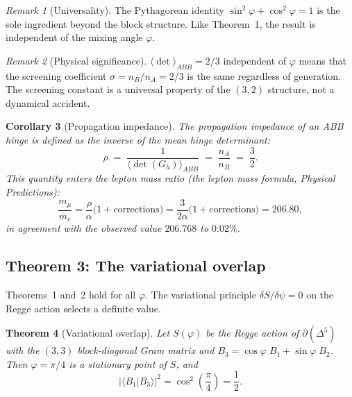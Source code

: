 \documentclass[12pt]{article}
\newtheorem{theorem}{Theorem}[section]
\newtheorem{corollary}[theorem]{Corollary}
\theoremstyle{remark}
\newtheorem{remark}[theorem]{Remark}
\theoremstyle{definition}
\begin{document}
\begin{remark}[Universality]
The Pythagorean identity $\sin^2\varphi + \cos^2\varphi = 1$ is the
sole ingredient beyond the block structure.  Like Theorem~1, the
result is independent of the mixing angle $\varphi$.
\end{remark}

\begin{remark}[Physical significance]
$\langle\det\rangle_{ABB} = 2/3$ independent of $\varphi$ means that the screening coefficient $\sigma = n_B/n_A = 2/3$ is the same regardless of generation.  The screening constant is a universal property of the $(3,2)$ structure, not a dynamical accident.
\end{remark}

\begin{corollary}[Propagation impedance]\label{cor:impedance}
The propagation impedance of an ABB hinge is defined as the inverse of
the mean hinge determinant:
\begin{equation}
\rho \;=\; \frac{1}{\langle\det(G_h)\rangle_{ABB}}
\;=\; \frac{n_A}{n_B} \;=\; \frac{3}{2}.
\end{equation}
This quantity enters the lepton mass ratio
(the lepton mass formula, \textit{Physical Predictions}):
\begin{equation}
\frac{m_\mu}{m_e} = \frac{\rho}{\alpha}
\bigl(1 + \text{corrections}\bigr)
= \frac{3}{2\alpha}
\bigl(1 + \text{corrections}\bigr)
= 206.80,
\end{equation}
in agreement with the observed value $206.768$ to $0.02\%$.
\end{corollary}

\subsection{Theorem 3: The variational overlap}
\label{sec:thm_overlap}

Theorems~1 and~2 hold for all $\varphi$.  The variational principle
$\delta S / \delta\psi = 0$ on the Regge action selects a definite
value.

\begin{theorem}[Variational overlap]\label{thm:overlap}
Let $S(\varphi)$ be the Regge action of $\partial(\Delta^5)$ with the
$(3,3)$ block-diagonal Gram matrix and
$B_3 = \cos\varphi\; B_1 + \sin\varphi\; B_2$.  Then
$\varphi = \pi/4$ is a stationary point of $S$, and
\begin{equation}
\boxed{|\langle B_1 | B_3 \rangle|^2 = \cos^2\!\left(\frac{\pi}{4}\right) = \frac{1}{2}.}
\end{equation}
\end{theorem}
\end{document}
